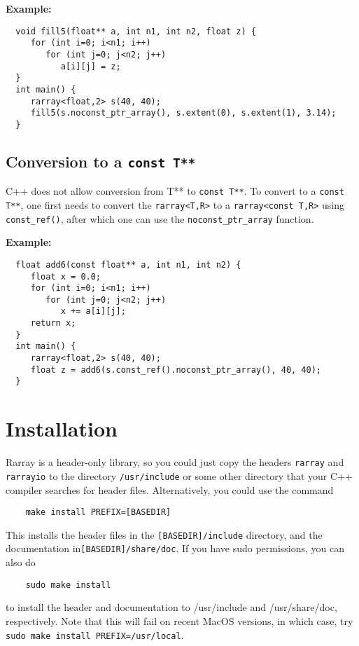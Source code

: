 \documentclass[11pt,twoside]{article}
\begin{document}
\noindent
{\bf Example:}
\vspace{-5pt}\begin{framed}\vspace{-14pt}%
\begin{verbatim}
  void fill5(float** a, int n1, int n2, float z) {
     for (int i=0; i<n1; i++)
        for (int j=0; j<n2; j++)
           a[i][j] = z;
  }
  int main() {
     rarray<float,2> s(40, 40);
     fill5(s.noconst_ptr_array(), s.extent(0), s.extent(1), 3.14);
  }
\end{verbatim}%
\vspace{-14pt}
\end{framed}

\subsection{Conversion to a {\tt const T**}}
\noindent
C++ does not allow conversion from T** to \texttt{const T**}. To convert to a \texttt{const T**}, one first needs to convert the \texttt{rarray{\tt<}T,R{\tt>}} to a \texttt{rarray{\tt<}const T,R{\tt>}} using \texttt{const\_ref()}, after which one can use the \texttt{noconst\_ptr\_array} function.

\noindent
{\bf Example:}
\vspace{-5pt}\begin{framed}\vspace{-14pt}%
\begin{verbatim}
  float add6(const float** a, int n1, int n2) {
     float x = 0.0;
     for (int i=0; i<n1; i++)
        for (int j=0; j<n2; j++)
           x += a[i][j];
     return x;
  }
  int main() {
     rarray<float,2> s(40, 40);
     float z = add6(s.const_ref().noconst_ptr_array(), 40, 40);
  }
\end{verbatim}%
\vspace{-14pt} 
\end{framed}

\pagebreak
\appendix

\section{Installation}

Rarray is a header-only library, so you could just copy the headers \texttt{rarray} and
\texttt{rarrayio} to the directory \texttt{/usr/include} or some other directory
that your C++ compiler searches for header files.  Alternatively, you could use the command
\begin{verbatim}
    make install PREFIX=[BASEDIR]
\end{verbatim}
This installs the header files in the \texttt{[BASEDIR]/include} directory,
and the documentation in\linebreak \texttt{[BASEDIR]/share/doc}.
If you have sudo permissions, you can also do
\begin{verbatim}
    sudo make install
\end{verbatim}
to install the header and documentation to /usr/include and /usr/share/doc,
respectively. Note that this will fail on recent MacOS versions,
in which case, try \texttt{sudo make install PREFIX=/usr/local}.
\end{document}
